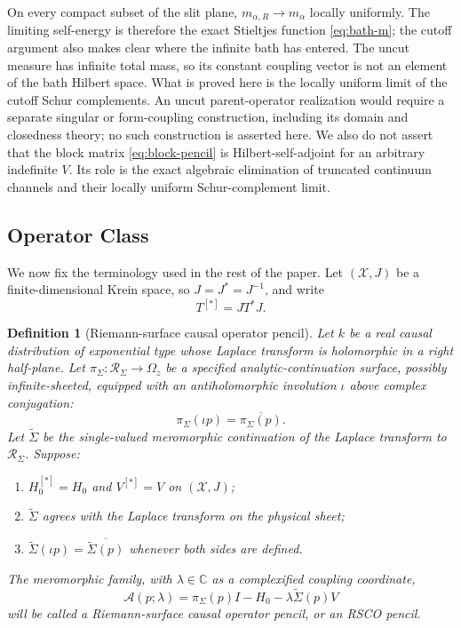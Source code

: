 \documentclass[11pt,reqno]{amsart}
\newtheorem{definition}[theorem]{Definition}
\theoremstyle{remark}
\newcommand{\C}{\mathbb C}
\newcommand{\cA}{\mathcal A}
\newcommand{\cR}{\mathcal R}
\newcommand{\cX}{\mathcal X}
\begin{document}
On every compact subset of the slit plane,
$m_{\alpha,R}\to m_\alpha$ locally uniformly.  The limiting self-energy is
therefore the exact Stieltjes function \eqref{eq:bath-m}; the cutoff argument
also makes clear where the infinite bath has entered.  The uncut measure has
infinite total mass, so its constant coupling vector is not an element of the
bath Hilbert space.  What is proved here is the locally uniform limit of the
cutoff Schur complements.  An uncut parent-operator realization would require
a separate singular or form-coupling construction, including its domain and
closedness theory; no such construction is asserted here.  We also do not
assert that the block matrix \eqref{eq:block-pencil} is
Hilbert-self-adjoint for an arbitrary indefinite $V$.  Its role is the exact
algebraic elimination of truncated continuum channels and their locally
uniform Schur-complement limit.

\subsection{Operator Class}

We now fix the terminology used in the rest of the paper.  Let
$(\cX,J)$ be a finite-dimensional Krein space, so $J=J^*=J^{-1}$, and write
\begin{equation}\label{eq:j-adjoint}
 T^{[*]}=JT^*J.
\end{equation}

\begin{definition}[Riemann-surface causal operator pencil]\label{def:rsco}
Let $k$ be a real causal distribution of exponential type whose Laplace
transform is holomorphic in a right half-plane.  Let
$\pi_\Sigma:\cR_\Sigma\to\Omega_z$ be a specified analytic-continuation
surface, possibly infinite-sheeted, equipped with an antiholomorphic
involution $\iota$ above complex conjugation:
\begin{equation}\label{eq:real-structure}
 \pi_\Sigma(\iota p)=\overline{\pi_\Sigma(p)}.
\end{equation}
Let $\widetilde\Sigma$ be the single-valued meromorphic continuation of the
Laplace transform to $\cR_\Sigma$.  Suppose:
\begin{enumerate}[label=\textnormal{(\roman*)}]
\item $H_0^{[*]}=H_0$ and $V^{[*]}=V$ on $(\cX,J)$;
\item $\widetilde\Sigma$ agrees with the Laplace transform on the physical
sheet;
\item $\widetilde\Sigma(\iota p)
=\overline{\widetilde\Sigma(p)}$ whenever both sides are defined.
\end{enumerate}
The meromorphic family, with $\lambda\in\C$ as a complexified coupling
coordinate,
\begin{equation}\label{eq:rsco-definition}
 \cA(p;\lambda)=\pi_\Sigma(p)I-H_0
 -\lambda\widetilde\Sigma(p)V
\end{equation}
will be called a \emph{Riemann-surface causal operator pencil}, or an
\emph{RSCO pencil}.
\end{definition}
\end{document}
